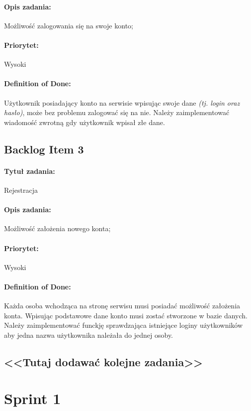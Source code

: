 \documentclass[a4paper]{article}
\begin{document}
	\paragraph{Opis zadania:} Możliwość zalogowania się na swoje konto;
	\paragraph{Priorytet:} Wysoki
	\paragraph{Definition of Done:} Użytkownik posiadający konto na serwisie wpisując swoje dane \emph{(tj. login oraz hasło)}, może bez problemu zalogować się na nie. Należy zaimplementować wiadomość zwrotną gdy użytkownik wpisał złe dane.
	
	\subsection{Backlog Item 3}
	\paragraph{Tytuł zadania:} Rejestracja
	\paragraph{Opis zadania:} Możliwość założenia nowego konta;
	\paragraph{Priorytet:} Wysoki
	\paragraph{Definition of Done:} Każda osoba wchodząca na stronę serwisu musi posiadać możliwość założenia konta. Wpisując podstawowe dane konto musi zostać stworzone w bazie danych. Należy zaimplementować funckję sprawdzająca istniejące loginy użytkowników aby jedna nazwa użytkownika należała do jednej osoby.
	
	\subsection*{<<Tutaj dodawać kolejne zadania>>}
	
	\section{Sprint 1}
\end{document}

